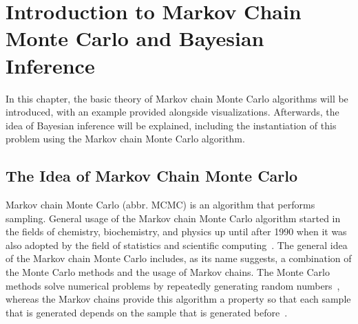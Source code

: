 \chapter{Introduction to Markov Chain Monte Carlo and Bayesian Inference}

In this chapter, the basic theory of Markov chain Monte Carlo algorithms will be introduced, with an example provided alongside visualizations. Afterwards, the idea of Bayesian inference will be explained, including the instantiation of this problem using the Markov chain Monte Carlo algorithm.

\section{The Idea of Markov Chain Monte Carlo}
Markov chain Monte Carlo (abbr. MCMC) is an algorithm that performs sampling. General usage of the Markov chain Monte Carlo algorithm started in the fields of chemistry, biochemistry, and physics up until after 1990 when it was also adopted by the field of statistics and scientific computing~\cite{mcmc_handbook}. The general idea of the Markov chain Monte Carlo includes, as its name suggests, a combination of the Monte Carlo methods and the usage of Markov chains. The Monte Carlo methods solve numerical problems by repeatedly generating random numbers~\cite{monte_carlo_methods}, whereas the Markov chains provide this algorithm a property so that each sample that is generated depends on the sample that is generated before~\cite{mcmc_wang}.

